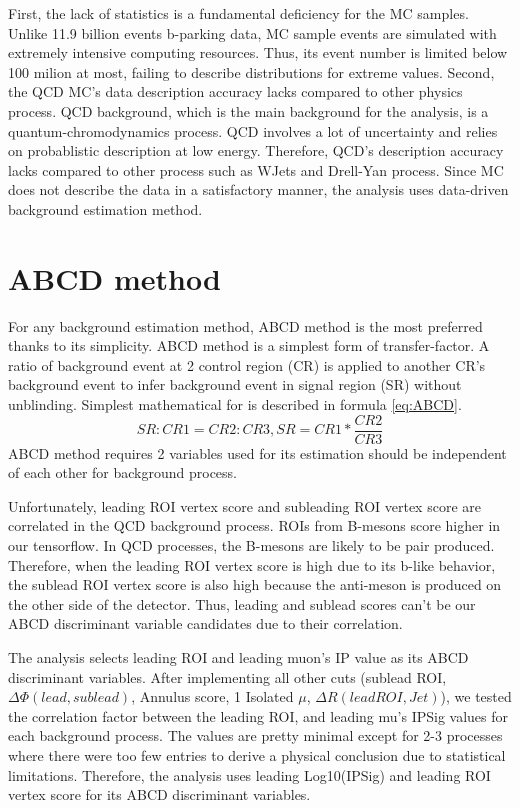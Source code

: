 First, the lack of statistics is a fundamental deficiency for the MC samples.
Unlike 11.9 billion events b-parking data, MC sample events are simulated with extremely intensive computing resources.
Thus, its event number is limited below 100 milion at most, failing to describe distributions for extreme values.
Second, the QCD MC's data description accuracy lacks compared to other physics process.
QCD background, which is the main background for the analysis, is a quantum-chromodynamics process.
QCD involves a lot of uncertainty and relies on probablistic description at low energy.
Therefore, QCD's description accuracy lacks compared to other process such as WJets and Drell-Yan process.
Since MC does not describe the data in a satisfactory manner, the analysis uses data-driven background estimation method.


\section{ABCD method}
For any background estimation method, ABCD method is the most preferred thanks to its simplicity.
ABCD method is a simplest form of transfer-factor.
A ratio of background event at 2 control region (CR) is applied to another CR's background event to infer background event in signal region (SR) without unblinding.
Simplest mathematical for is described in formula \ref{eq:ABCD}.
\begin{equation}
\label{eq:ABCD}
	SR:CR1=CR2:CR3, SR=CR1*\frac{CR2}{CR3} 
\end{equation}
ABCD method requires 2 variables used for its estimation should be independent of each other for background process.


Unfortunately, leading ROI vertex score and subleading ROI vertex score are correlated in the QCD background process.
ROIs from B-mesons score higher in our tensorflow.
In QCD processes, the B-mesons are likely to be pair produced.
Therefore, when the leading ROI vertex score is high due to its b-like behavior, the sublead ROI vertex score is also high because the anti-meson is produced on the other side of the detector.
Thus, leading and sublead scores can't be our ABCD discriminant variable candidates due to their correlation.

The analysis selects leading ROI and leading muon's IP value as its ABCD discriminant variables.
After implementing all other cuts (sublead ROI, $\Delta\Phi(lead,sublead)$, Annulus score, 1 Isolated $\mu$, $\Delta R(lead ROI, Jet)$), we tested the correlation factor between the leading ROI, and leading mu's IPSig values for each background process.
The values are pretty minimal except for 2-3 processes where there were too few entries to derive a physical conclusion due to statistical limitations.
Therefore, the analysis uses leading Log10(IPSig) and leading ROI vertex score for its ABCD discriminant variables.


